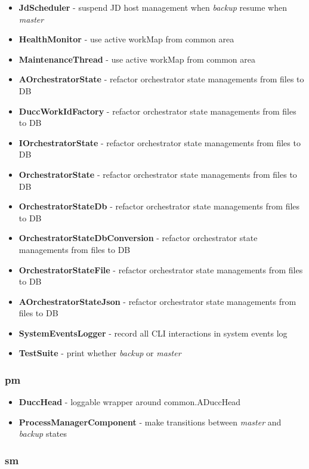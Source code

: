 \documentclass[letterpaper]{article}
\begin{document}
{\begin{itemize}
  \item \textbf{JdScheduler} - suspend JD host management when {\em backup} resume when {\em master}
  \item \textbf{HealthMonitor} - use active workMap from common area
  \item \textbf{MaintenanceThread} - use active workMap from common area
  \item \textbf{AOrchestratorState} - refactor orchestrator state managements from files to DB
  \item \textbf{DuccWorkIdFactory} - refactor orchestrator state managements from files to DB
  \item \textbf{IOrchestratorState} - refactor orchestrator state managements from files to DB
  \item \textbf{OrchestratorState} - refactor orchestrator state managements from files to DB
  \item \textbf{OrchestratorStateDb} - refactor orchestrator state managements from files to DB
  \item \textbf{OrchestratorStateDbConversion} - refactor orchestrator state managements from files to DB
  \item \textbf{OrchestratorStateFile} - refactor orchestrator state managements from files to DB
  \item \textbf{AOrchestratorStateJson} - refactor orchestrator state managements from files to DB
  \item \textbf{SystemEventsLogger} - record all CLI interactions in system events log
  \item \textbf{TestSuite} - print whether {\em backup} or {\em master}
\end{itemize}
}

\subsubsection{pm}

{\renewcommand\labelitemi{}
\begin{itemize}
  \item \textbf{DuccHead} - loggable wrapper around common.ADuccHead
  \item \textbf{ProcessManagerComponent} - make transitions between {\em master} and {\em backup} states
\end{itemize}
}

\subsubsection{sm}
\end{document}
